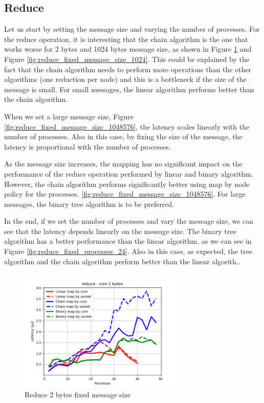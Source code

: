 \subsection{Reduce}

Let us start by setting the message size and varying the number of processes. For the reduce operation, it is interesting that the chain algorithm is the one that works worse for 2 bytes and 1024 bytes message size, as shown in Figure \ref{fig:reduce_fixed_message_size_2} and Figure \ref{fig:reduce_fixed_message_size_1024}. 
This could be explained by the fact that the chain algorithm needs to perform more operations than the other algorithms (one reduction per node)
and this is a bottleneck if the size of the message is small. For small messages, the linear algorithm performs better than the chain algorithm.

When we set a large message size, Figure \ref{fig:reduce_fixed_message_size_1048576}, the latency scales linearly with the number of processes. Also in this case, by fixing the size of the message, the latency is proportional with the number of processes. 

As the message size increases, the mapping has no significant impact on the performance of the reduce operation performed by linear and binary algorithm. However, the chain algorithm performs significantly better using map by node policy for the processes, \ref{fig:reduce_fixed_message_size_1048576}. For large messages, the binary tree algorithm is to be preferred.

In the end, if we set the number of processes and vary the message size, we can see that the latency depends linearly on the message size. The binary tree algorithm has a better performance than the linear algorithm, as we can see in Figure \ref{fig:reduce_fixed_processes_24}. Also in this case, as expected, the tree algorithm and the chain algorithm perform better than the linear algorith,.

\begin{figure}[h!]
    \centering
    \includegraphics[width=0.7\textwidth]{../plots/reduce_fixedSize2.png}
    \caption{Reduce 2 bytes fixed message size}
    \label{fig:reduce_fixed_message_size_2}
\end{figure}

